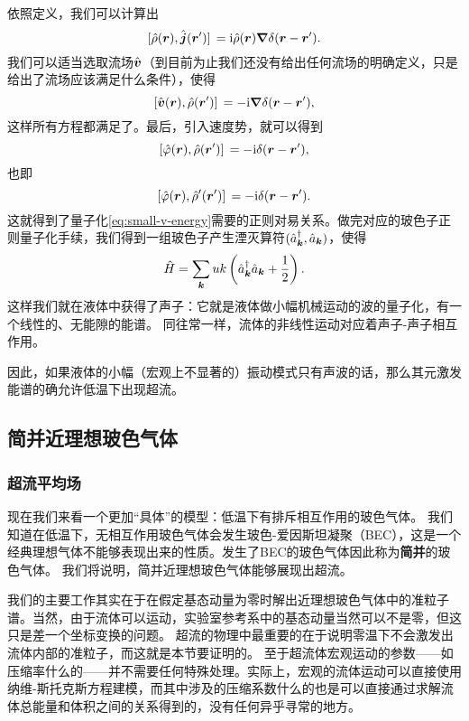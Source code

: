 \documentclass[hyperref, UTF8, a4paper]{ctexart}
\newcommand*{\ii}{\mathrm{i}}
\renewcommand{\emph}{\textbf}
\begin{document}
依照定义，我们可以计算出
\[
    \comm*{\hat{\rho}(\vb*{r})}{\hat{\vb*{j}}(\vb*{r}')} = \ii \hat{\rho}(\vb*{r}) \grad{\delta(\vb*{r} - \vb*{r}')}.
\]
我们可以适当选取流场$\hat{\vb*{v}}$（到目前为止我们还没有给出任何流场的明确定义，只是给出了流场应该满足什么条件），使得
\[
    \comm*{\hat{\vb*{v}}(\vb*{r})}{\hat{\rho}(\vb*{r}')} = - \ii \grad{\delta(\vb*{r} - \vb*{r}')},
\]
这样所有方程都满足了。最后，引入速度势，就可以得到
\[
    \comm*{\hat{\varphi}(\vb*{r})}{\hat{\rho}(\vb*{r}')} = - \ii \delta(\vb*{r} - \vb*{r}'),
\]
也即
\begin{equation}
    \comm*{\hat{\varphi}(\vb*{r})}{\hat{\rho}'(\vb*{r}')} = - \ii \delta(\vb*{r} - \vb*{r}').
\end{equation}
这就得到了量子化\eqref{eq:small-v-energy}需要的正则对易关系。做完对应的玻色子正则量子化手续，我们得到一组玻色子产生湮灭算符$(\hat{a}^\dagger_{\vb*{k}}, \hat{a}_{\vb*{k}})$，使得
\begin{equation}
    \hat{H} = \sum_{\vb*{k}} u k \left( \hat{a}^\dagger_{\vb*{k}} \hat{a}_{\vb*{k}} + \frac{1}{2} \right).
\end{equation}
这样我们就在液体中获得了声子：它就是液体做小幅机械运动的波的量子化，有一个线性的、无能隙的能谱。
同往常一样，流体的非线性运动对应着声子-声子相互作用。

因此，如果液体的小幅（宏观上不显著的）振动模式只有声波的话，那么其元激发能谱的确允许低温下出现超流。

\subsection{简并近理想玻色气体}

\subsubsection{超流平均场}

现在我们来看一个更加“具体”的模型：低温下有排斥相互作用的玻色气体。
我们知道在低温下，无相互作用玻色气体会发生玻色-爱因斯坦凝聚（BEC），这是一个经典理想气体不能够表现出来的性质。发生了BEC的玻色气体因此称为\emph{简并}的玻色气体。
我们将说明，简并近理想玻色气体能够展现出超流。

我们的主要工作其实在于在假定基态动量为零时解出近理想玻色气体中的准粒子谱。当然，由于流体可以运动，实验室参考系中的基态动量当然可以不是零，但这只是差一个坐标变换的问题。
超流的物理中最重要的在于说明零温下不会激发出流体内部的准粒子，而这就是本节要证明的。
至于超流体宏观运动的参数——如压缩率什么的——并不需要任何特殊处理。实际上，宏观的流体运动可以直接使用纳维-斯托克斯方程建模，而其中涉及的压缩系数什么的也是可以直接通过求解流体总能量和体积之间的关系得到的，没有任何异乎寻常的地方。
\end{document}
